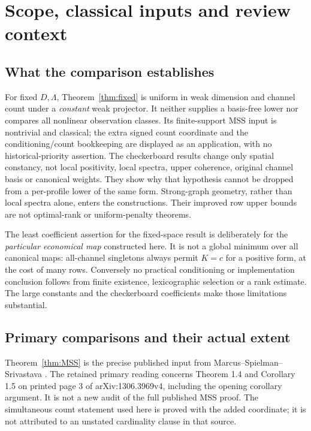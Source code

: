 \section{Scope, classical inputs and review context}\label{sec:context}
\subsection{What the comparison establishes}
For fixed $D,\Lambda$, Theorem~\ref{thm:fixed} is uniform in weak dimension
and channel count under a \emph{constant} weak projector. It neither supplies
a basis-free lower nor compares all nonlinear observation classes. Its
finite-support MSS input is nontrivial and classical; the extra signed count
coordinate and the conditioning/count bookkeeping are displayed as an
application, with no historical-priority assertion.
The checkerboard results change only spatial constancy, not local positivity,
local spectra, upper coherence, original channel basis or canonical weights.
They show why that hypothesis cannot be dropped from a per-profile lower of
the same form. Strong-graph geometry, rather than local spectra alone, enters
the constructions. Their improved row upper bounds are not optimal-rank or
uniform-penalty theorems.

The least coefficient assertion for the fixed-space result is deliberately
for the \emph{particular economical map} constructed here. It is not a global
minimum over all canonical maps: all-channel singletons always permit $K=c$
for a positive form, at the cost of many rows. Conversely no practical
conditioning or implementation conclusion follows from finite existence,
lexicographic selection or a rank estimate. The large constants and the
checkerboard coefficients make those limitations substantial.

\subsection{Primary comparisons and their actual extent}
Theorem~\ref{thm:MSS} is the precise published input from
Marcus--Spielman--Srivastava \cite{MSS}. The retained primary reading concerns
Theorem 1.4 and Corollary 1.5 on printed page 3 of arXiv:1306.3969v4,
including the opening corollary argument. It is not a new audit of the full
published MSS proof. The simultaneous count statement used here is proved
with the added coordinate; it is not attributed to an unstated cardinality
clause in that source.

